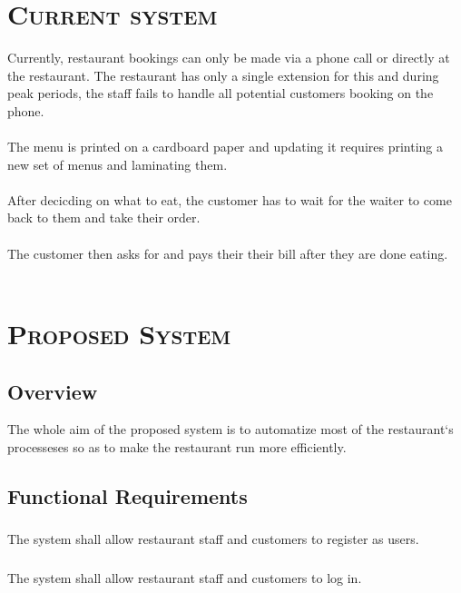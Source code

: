 \documentclass[15, notitlepage]{article}
\begin{document}


\section{\scshape{Current system}}
Currently, restaurant bookings can only be made via a phone call or directly at the restaurant. The restaurant has only a single extension for this and during peak periods, the staff fails to handle all potential customers booking on the phone.\\\\
The menu is printed on a cardboard paper and updating it requires printing a new set of menus and laminating them.\\\\
After decicding on what to eat, the customer has to wait for the waiter to come back to them and take their order.\\\\
The customer then asks for and pays their their bill after they are done eating.\\\\

\section{\scshape{Proposed System}}
\subsection{Overview}
The whole aim of the proposed system is to automatize most of the restaurant`s processeses so as to make the restaurant run more efficiently.

\subsection{Functional Requirements}
\subsubsection{}The system shall allow restaurant staff and customers to register as users.
\subsubsection{}The system shall allow restaurant staff and customers to log in.
\end{document}
